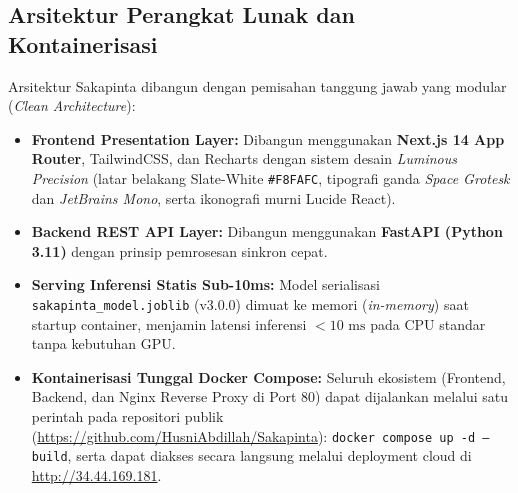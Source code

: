 \documentclass[12pt,a4paper]{article}
\begin{document}
\subsection{Arsitektur Perangkat Lunak dan Kontainerisasi}
Arsitektur Sakapinta dibangun dengan pemisahan tanggung jawab yang modular (\textit{Clean Architecture}):
\begin{itemize}
    \item \textbf{Frontend Presentation Layer:} Dibangun menggunakan \textbf{Next.js 14 App Router}, TailwindCSS, dan Recharts dengan sistem desain \textit{Luminous Precision} (latar belakang Slate-White \texttt{\#F8FAFC}, tipografi ganda \textit{Space Grotesk} dan \textit{JetBrains Mono}, serta ikonografi murni Lucide React).
    \item \textbf{Backend REST API Layer:} Dibangun menggunakan \textbf{FastAPI (Python 3.11)} dengan prinsip pemrosesan sinkron cepat.
    \item \textbf{Serving Inferensi Statis Sub-10ms:} Model serialisasi \texttt{sakapinta\_model.joblib} (v3.0.0) dimuat ke memori (\textit{in-memory}) saat startup container, menjamin latensi inferensi $<10\text{ ms}$ pada CPU standar tanpa kebutuhan GPU.
    \item \textbf{Kontainerisasi Tunggal Docker Compose:} Seluruh ekosistem (Frontend, Backend, dan Nginx Reverse Proxy di Port 80) dapat dijalankan melalui satu perintah pada repositori publik (\url{https://github.com/HusniAbdillah/Sakapinta}): \texttt{docker compose up -d --build}, serta dapat diakses secara langsung melalui deployment cloud di \url{http://34.44.169.181}.
\end{itemize}
\end{document}
